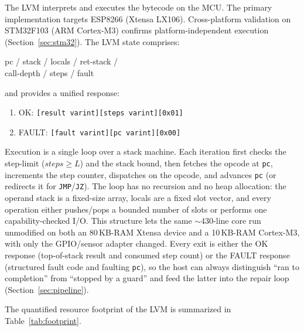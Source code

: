 \documentclass[a4paper,fleqn,longmktitle]{cas-dc}
\begin{document}
The LVM interprets and executes the bytecode on the MCU. The primary implementation targets ESP8266 (Xtensa LX106). Cross-platform validation on STM32F103 (ARM Cortex-M3) confirms platform-independent execution (Section~\ref{sec:stm32}). The LVM state comprises:

\begin{center}
\ttfamily\small
pc / stack / locals / ret-stack / \\
call-depth / steps / fault
\end{center}

and provides a unified response:

\begin{enumerate}
  \item OK: \texttt{[result varint][steps varint][0x01]}
  \item FAULT: \texttt{[fault varint][pc varint][0x00]}
\end{enumerate}

Execution is a single loop over a stack machine. Each iteration first checks the step-limit ($\textit{steps} \geq L$) and the stack bound, then fetches the opcode at \texttt{pc}, increments the step counter, dispatches on the opcode, and advances \texttt{pc} (or redirects it for \texttt{JMP}/\texttt{JZ}). The loop has no recursion and no heap allocation: the operand stack is a fixed-size array, locals are a fixed slot vector, and every operation either pushes/pops a bounded number of slots or performs one capability-checked I/O. This structure lets the same $\sim$430-line core run unmodified on both an 80\,KB-RAM Xtensa device and a 10\,KB-RAM Cortex-M3, with only the GPIO/sensor adapter changed. Every exit is either the OK response (top-of-stack result and consumed step count) or the FAULT response (structured fault code and faulting \texttt{pc}), so the host can always distinguish ``ran to completion'' from ``stopped by a guard'' and feed the latter into the repair loop (Section~\ref{sec:pipeline}).

The quantified resource footprint of the LVM is summarized in Table~\ref{tab:footprint}.
\end{document}
